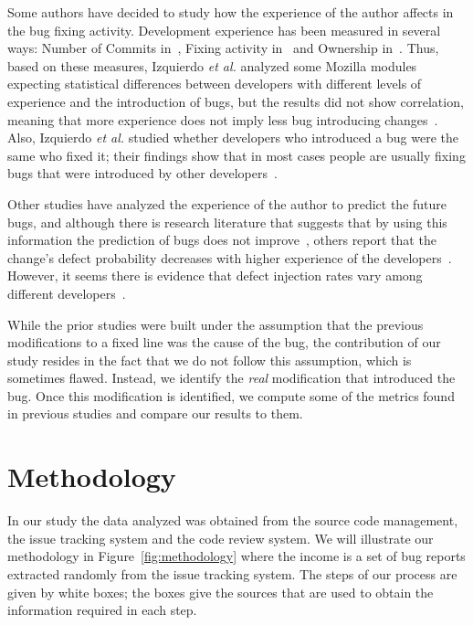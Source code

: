 \documentclass[10pt, conference]{IEEEtran}
\begin{document}
Some authors have decided to study how the experience of the author affects in the bug fixing activity. Development experience has been measured in several ways: Number of Commits in~\cite{eyolfson2011time}, Fixing activity in~\cite{ahsan2010mining} and Ownership in~\cite{german2004using}. Thus, based on these measures, Izquierdo \emph{et al.} analyzed some Mozilla modules expecting statistical differences between developers with different levels of experience and the introduction of bugs, but the results did not show correlation, meaning that more experience does not imply less bug introducing changes~\cite{izquierdo2012more}. Also, Izquierdo \emph{et al.} studied whether developers who introduced a bug were the same who fixed it; their findings show that in most cases people are usually fixing bugs that were introduced by other developers~\cite{izquierdo2011developers}. 

Other studies have analyzed the experience of the author to predict the future bugs, and although there is research literature that suggests that by using this information the prediction of bugs does not improve~\cite{weyuker2010programmer}, others report that the change's defect probability decreases with higher experience of the developers~\cite{mockus2000predicting}. However, it seems there is evidence that defect injection rates vary among different developers~\cite{matsumoto2010analysis}.


While the prior studies were built under the assumption that the previous modifications to a fixed line was the cause of the bug, the contribution of our study resides in the fact that we do not follow this assumption, which is sometimes flawed. Instead, we identify the \emph{real} modification that introduced the bug. Once this modification is identified, we compute some of the metrics found in previous studies and compare our results to them.

\section{Methodology}
\label{sec:methodology}

In our study the data analyzed was obtained from the source code management, the issue tracking system and the code review system. We will illustrate our methodology in Figure~\ref{fig:methodology} where the income is a set of bug reports extracted randomly from the issue tracking system. The steps of our process are given by white boxes; the  boxes give the sources that are used to obtain the information required in each step.
\end{document}
